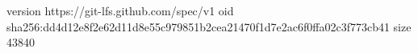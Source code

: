 version https://git-lfs.github.com/spec/v1
oid sha256:dd4d12e8f2e62d11d8e55c979851b2cea21470f1d7e2ac6f0ffa02c3f773cb41
size 43840
